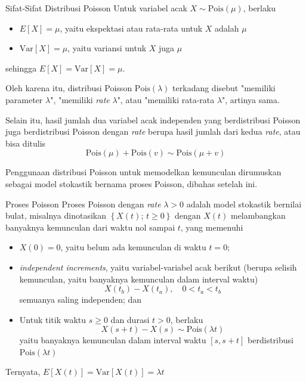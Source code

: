 \documentclass{beamer}
\newcommand{\brackets}[1]{\left[#1\right]}
\newcommand{\braces}[1]{\left\{#1\right\}}
\begin{document}
\begin{frame}{Sifat-Sifat Distribusi Poisson}
    Untuk variabel acak \(X \sim \text{Pois}(\mu)\), berlaku
    \begin{itemize}
        \item \(E\brackets{X} = \mu\), yaitu ekspektasi atau rata-rata untuk \(X\) adalah \(\mu\)
        \item \(\text{Var}\brackets{X} = \mu\), yaitu variansi untuk \(X\) juga \(\mu\)
    \end{itemize}
    sehingga \(E\brackets{X} = \text{Var}\brackets{X} = \mu\).

    Oleh karena itu, distribusi Poisson \(\text{Pois}(\lambda)\) terkadang disebut "memiliki parameter \(\lambda\)", "memiliki \textit{rate} \(\lambda\)", atau "memiliki rata-rata \(\lambda\)", artinya sama.

    Selain itu, hasil jumlah dua variabel acak independen yang berdistribusi Poisson juga berdistribusi Poisson dengan \textit{rate} berupa hasil jumlah dari kedua \textit{rate}, atau bisa ditulis
    \[\text{Pois}(\mu) + \text{Pois}(v) \sim \text{Pois}(\mu + v)\]

    Penggunaan distribusi Poisson untuk memodelkan kemunculan dirumuskan sebagai model stokastik bernama proses Poisson, dibahas setelah ini.
\end{frame}

\begin{frame}{Proses Poisson}
    Proses Poisson dengan \textit{rate} \(\lambda > 0\) adalah model stokastik bernilai bulat, misalnya dinotasikan \( \braces{X(t); \, t \ge 0} \) dengan \(X(t)\) melambangkan banyaknya kemunculan dari waktu nol sampai \(t\), yang memenuhi
    \begin{itemize}
        \item \(X(0) = 0\), yaitu belum ada kemunculan di waktu \(t=0\);
        \item \textit{independent increments}, yaitu variabel-variabel acak berikut (berupa selisih kemunculan, yaitu banyaknya kemunculan dalam interval waktu)
        \[ X(t_b) - X(t_a), \quad 0 < t_a < t_b \]
        semuanya saling independen; dan
        \item Untuk titik waktu \(s \ge 0\) dan durasi \(t > 0\), berlaku
        \[X(s+t) - X(s) \sim \text{Pois}(\lambda t)\]
        yaitu banyaknya kemunculan dalam interval waktu \(\brackets{s,s+t}\) berdistribusi \(\text{Pois}(\lambda t)\)
    \end{itemize}
    Ternyata, \(E\brackets{X(t)} = \text{Var}\brackets{X(t)} = \lambda t\)
\end{frame}
\end{document}

